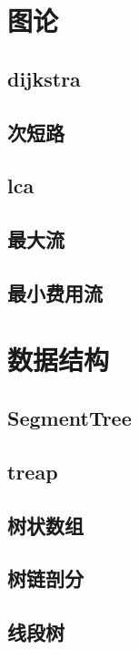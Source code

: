 \documentclass[twocolumn,a4,twoside]{book}
\begin{document}
	\chapter{图论}
		\section{dijkstra}
		
		\section{次短路}
		
		\section{lca}
		
		\section{最大流}
		
		\section{最小费用流}
		
	
	\chapter{数据结构}
		\section{SegmentTree}
		
		\section{treap}
		
		\section{树状数组}
		
		\section{树链剖分}
		
		\section{线段树}
		
	
\end{document}
